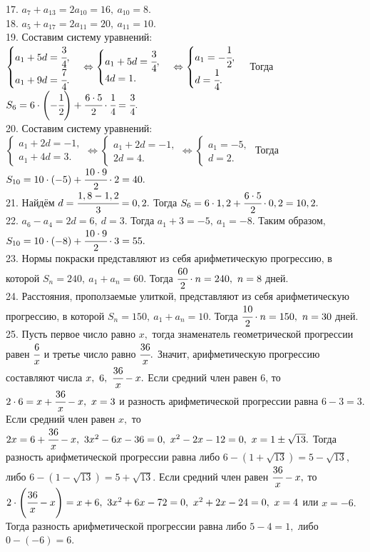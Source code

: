 \documentclass[12pt]{article}
\begin{document}
17. $a_7+a_{13}=2a_{10}=16,\ a_{10}=8.$\\
18. $a_5+a_{17}=2a_{11}=20,\ a_{11}=10.$\\
19. Составим систему уравнений: $\begin{cases}a_1+5d=\cfrac{3}{4},\\a_1+9d=\cfrac{7}{4}.\end{cases}\Leftrightarrow\begin{cases}a_1+5d=\cfrac{3}{4},\\4d=1.\end{cases}
\Leftrightarrow\begin{cases}a_1=-\cfrac{1}{2},\\d=\cfrac{1}{4}.\end{cases}$ Тогда $S_6=6\cdot\left(-\cfrac{1}{2}\right)+\cfrac{6\cdot5}{2}\cdot\cfrac{1}{4}=\cfrac{3}{4}.$\\
20. Составим систему уравнений: $\begin{cases}a_1+2d=-1,\\a_1+4d=3.\end{cases}\Leftrightarrow\begin{cases}a_1+2d=-1,\\2d=4.\end{cases}
\Leftrightarrow\begin{cases}a_1=-5,\\d=2.\end{cases}$ Тогда $S_{10}=10\cdot\left(-5\right)+\cfrac{10\cdot9}{2}\cdot2=40.$\\
21. Найдём $d=\cfrac{1,8-1,2}{3}=0,2.$ Тогда $S_6=6\cdot1,2+\cfrac{6\cdot5}{2}\cdot0,2=10,2.$\\
22. $a_6-a_4=2d=6,\ d=3.$ Тогда $a_1+3=-5,\ a_1=-8.$ Таким образом, $S_{10}=10\cdot(-8)+\cfrac{10\cdot9}{2}\cdot3=55.$\\
23. Нормы покраски представляют из себя арифметическую прогрессию, в которой $S_n=240,\ a_1+a_n=60.$ Тогда $\cfrac{60}{2}\cdot n=240,\ n=8$ дней.\\
24. Расстояния, проползаемые улиткой, представляют из себя арифметическую прогрессию, в которой $S_n=150,\ a_1+a_n=10.$ Тогда $\cfrac{10}{2}\cdot n=150,\ n=30$ дней.\\
25. Пусть первое число равно $x,$ тогда знаменатель геометрической прогрессии равен $\cfrac{6}{x}$ и третье число равно $\cfrac{36}{x}.$ Значит, арифметическую прогрессию составляют числа $x,\ 6,\ \cfrac{36}{x}-x.$ Если средний член равен 6, то $2\cdot6=x+\cfrac{36}{x}-x,\ x=3$ и разность арифметической прогрессии равна $6-3=3.$ Если средний член равен $x,$ то $2x=6+\cfrac{36}{x}-x,\ 3x^2-6x-36=0,\ x^2-2x-12=0,\ x=1\pm\sqrt{13}.$ Тогда разность арифметической прогрессии равна либо $6-(1+\sqrt{13})=5-\sqrt{13},$ либо $6-(1-\sqrt{13})=5+\sqrt{13}.$ Если средний член равен $\cfrac{36}{x}-x,$ то $2\cdot\left(\cfrac{36}{x}-x\right)=x+6,\ 3x^2+6x-72=0,\ x^2+2x-24=0,\ x=4$ или $x=-6.$ Тогда разность арифметической прогрессии равна либо $5-4=1,$ либо $0-(-6)=6.$\\
\end{document}
